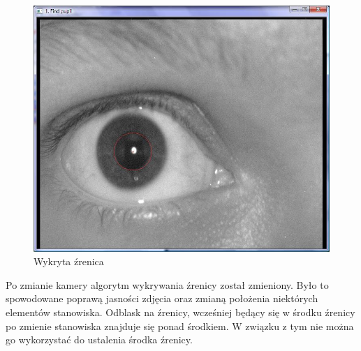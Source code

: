 \begin{figure}
\begin{center}
\includegraphics[scale=0.5]{zrenica.jpg}
\caption{Wykryta źrenica}
\label{fig:zrenicaNasza}
\end{center}
\end{figure}

Po zmianie kamery algorytm wykrywania źrenicy został zmieniony. Było to spowodowane poprawą jasności zdjęcia oraz zmianą położenia niektórych elementów stanowiska. Odblask na źrenicy, wcześniej będący się w środku źrenicy po zmienie stanowiska znajduje się ponad środkiem. W związku z tym nie można go wykorzystać do ustalenia środka źrenicy.

